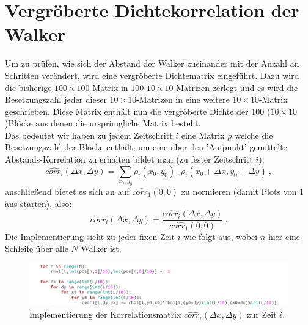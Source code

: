\documentclass[a4paper, 12pt]{report}
\begin{document}
\section{Vergröberte Dichtekorrelation der Walker}
\noindent Um zu prüfen, wie sich der Abstand der Walker zueinander mit der Anzahl an Schritten verändert, wird eine vergröberte Dichtematrix eingeführt. Dazu wird die bisherige \newline $100\times 100$-Matrix in $100$ $10\times 10$-Matrizen zerlegt und es wird die Besetzungszahl jeder dieser $10\times 10$-Matrizen in eine weitere $10\times 10$-Matrix geschrieben. Diese Matrix enthält nun die vergröberte Dichte der 100 ($10\times 10$)Blöcke aus denen die ursprüngliche Matrix besteht. 
\\
\noindent Das bedeutet wir haben zu jedem Zeitschritt $i$ eine Matrix $\rho$ welche die Besetzungszahl der Blöcke enthält, um eine über den 'Aufpunkt' gemittelte Abstands-Korrelation zu erhalten bildet man (zu fester Zeitschritt $i$):
\begin{equation}
\hat{corr_i}(\Delta x,\Delta y) = \sum_{x_0,y_0}\rho_i(x_0,y_0)\cdot\rho_i(x_0+\Delta x,y_0+\Delta y)\ ,
\end{equation}
anschließend bietet es sich an auf $\hat{corr_1}(0,0)$ zu normieren (damit Plots von 1 aus starten), also:
\begin{equation}
corr_i(\Delta x,\Delta y) = \frac{ \hat{corr_i}(\Delta x,\Delta y) }{ \hat{corr_1}(0,0) } \ .
\end{equation}
Die Implementierung sieht zu jeder fixen Zeit $i$ wie folgt aus, wobei $n$ hier eine Schleife über alle $N$ Walker ist.
\vspace{0.3cm}
\begin{figure}[h!]
	\centering
	\includegraphics[scale=0.7]{corrcode.png}
	\caption{Implementierung der Korrelationsmatrix $\hat{corr_i}(\Delta x,\Delta y)$ zur Zeit $i$.}
\end{figure}

\newpage
\end{document}
